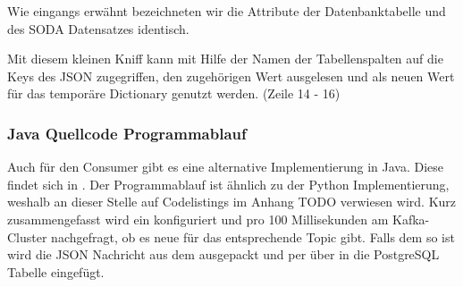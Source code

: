 Wie eingangs erwähnt bezeichneten wir die Attribute der Datenbanktabelle und des \ac{SODA} Datensatzes identisch.

Mit diesem kleinen \glqq Kniff\grqq{} kann mit Hilfe der Namen der Tabellenspalten
auf die Keys des \ac{JSON} zugegriffen, den zugehörigen Wert ausgelesen und als neuen Wert für das temporäre Dictionary genutzt werden.
(Zeile 14 - 16)

\subsubsection{Java Quellcode Programmablauf}
Auch für den Consumer gibt es eine alternative Implementierung in Java.
Diese findet sich in .
Der Programmablauf ist ähnlich zu der Python Implementierung, weshalb an dieser Stelle auf Codelistings im Anhang TODO verwiesen wird.
Kurz zusammengefasst wird ein  konfiguriert und pro 100 Millisekunden am Kafka-Cluster nachgefragt, ob es neue  für das entsprechende Topic gibt.
Falls dem so ist wird die \ac{JSON} Nachricht aus dem  ausgepackt und per  über  in die PostgreSQL Tabelle eingefügt.
